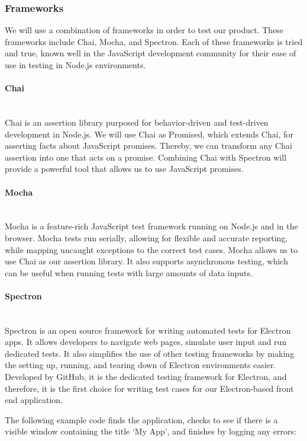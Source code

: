 \subsubsection{Frameworks}
We will use a combination of frameworks in order to test our product. These frameworks include Chai, Mocha, and Spectron. Each of these frameworks is tried and true, known well in the JavaScript development community for their ease of use in testing in Node.js environments.

\paragraph{Chai} \mbox{}\\[\paragraphheaderspace]
Chai is an assertion library purposed for behavior-driven and test-driven development in Node.js. We will use Chai as Promised, which extends Chai, for asserting facts about JavaScript promises. Thereby, we can transform any Chai assertion into one that acts on a promise. Combining Chai with Spectron will provide a powerful tool that allows us to use JavaScript promises.

\paragraph{Mocha} \mbox{}\\[\paragraphheaderspace]
Mocha is a feature-rich JavaScript test framework running on Node.js and in the browser. Mocha tests run serially, allowing for flexible and accurate reporting, while mapping uncaught exceptions to the correct test cases. Mocha allows us to use Chai as our assertion library. It also supports asynchronous testing, which can be useful when running tests with large amounts of data inputs.

\paragraph{Spectron} \mbox{}\\[\paragraphheaderspace]
Spectron is an open source framework for writing automated tests for Electron apps. It allows developers to navigate web pages, simulate user input and run dedicated tests. It also simplifies the use of other testing frameworks by making the setting up, running, and tearing down of Electron environments easier. Developed by GitHub, it is the dedicated testing framework for Electron, and therefore, it is the first choice for writing test cases for our Electron-based front end application.\par
The following example code finds the application, checks to see if there is a visible window containing the title \lq My App\rq, and finishes by logging any errors:

